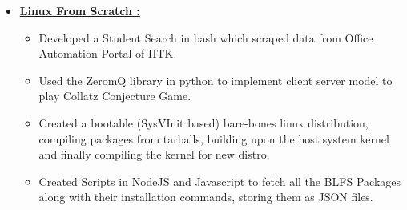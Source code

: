{\fontsize{11pt}{1em}\bodyfontlight\upshape\color{text}
	\begin{itemize}
		\item \href{https://github.com/mayanksha/LFS-Scripts}{\textbf{Linux From Scratch \ExternalLink : }}  
			\begin{itemize}
				\item Developed a Student Search in bash which scraped data from Office Automation Portal of IITK. 
				\item Used the ZeromQ library in python to implement client server model to play Collatz Conjecture Game.
				\item Created a bootable (SysVInit based) bare-bones linux distribution, compiling packages from tarballs, building upon the host system kernel and finally compiling the kernel for new distro.
				\item Created Scripts in NodeJS and Javascript to fetch all the BLFS Packages along with their installation commands, storing them as JSON files. 
			\end{itemize}
	\end{itemize}
}
